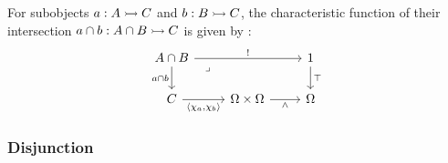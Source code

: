 \begin{definition}[Intersection]
  For subobjects $a: A\rightarrowtail C$ and $b: B\rightarrowtail C$, the characteristic function of
  their intersection $a\cap b:A\cap B \rightarrowtail C$ is given by
  \parencite[p.~147]{goldblatt:topoi}:
  \[\begin{tikzcd}[ampersand replacement=\&]
    {A\cap B} \&\& 1 \\
    C \& \Omega\times\Omega \& \Omega
    \arrow["\top", from=1-3, to=2-3]
    \arrow["{a\cap b}"', from=1-1, to=2-1]
    \arrow["{!}", from=1-1, to=1-3]
    \arrow["{\langle\chi_a,\chi_b\rangle}"', from=2-1, to=2-2]
    \arrow["\land"', from=2-2, to=2-3]
    \arrow["\lrcorner"{anchor=center, pos=0.125}, draw=none, from=1-1, to=2-3]
  \end{tikzcd}\]
\end{definition}

\subsubsection{Disjunction}

